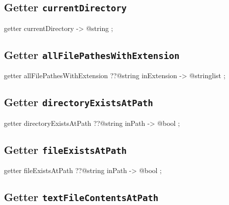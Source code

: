 \subsection{Getter \texttt{currentDirectory}}

\begin{galgascode}
getter currentDirectory -> @string ;
\end{galgascode}








\subsection{Getter \texttt{allFilePathesWithExtension}}

\begin{galgascode}
getter allFilePathesWithExtension ??@string inExtension -> @stringlist ;
\end{galgascode}










\subsection{Getter \texttt{directoryExistsAtPath}}

\begin{galgascode}
getter directoryExistsAtPath ??@string inPath -> @bool ;
\end{galgascode}










\subsection{Getter \texttt{fileExistsAtPath}}

\begin{galgascode}
getter fileExistsAtPath ??@string inPath -> @bool ;
\end{galgascode}










\subsection{Getter \texttt{textFileContentsAtPath}}

